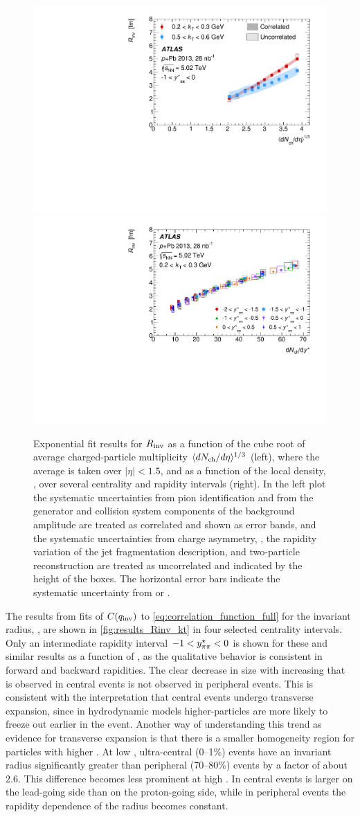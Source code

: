 \begin{figure}[t]
\centering
\includegraphics[width=0.49\linewidth]{canqinv_R_vs_avg_mult.pdf}
\includegraphics[width=0.49\linewidth]{canqinv_R_kt1_vs_mult.pdf}
\caption{Exponential fit results for $R_{\mathrm{inv}}$ as a function of the cube root of average charged-particle multiplicity $\langle d\mbox{$N_{\mathrm{ch}}$}/d\eta\rangle^{1/3}$ (left), where the average is taken over $|\eta| < 1.5$, and as a function of the local density, \dNdy, over several centrality and rapidity intervals (right). In the left plot the systematic uncertainties from pion identification and from the generator and collision system components of the background amplitude are treated as correlated and shown as error bands, and the systematic uncertainties from charge asymmetry, \Reff, the rapidity variation of the jet fragmentation description, and two-particle reconstruction are treated as uncorrelated and indicated by the height of the boxes. The horizontal error bars indicate the systematic uncertainty from \avgdNdeta or \dNdy.}
\label{fig:results_Rinv_dndeta}
\end{figure}

The results from fits of $C(q_{\mathrm{inv}})$ to \cref{eq:correlation_function_full} for the invariant radius, \Rinv, are shown in \cref{fig:results_Rinv_kt} in four selected centrality intervals.
Only an intermediate rapidity interval $-1 < y^{\star}_{\pi\pi} < 0$ is shown for these and similar results as a function of \kt, as the qualitative behavior is consistent in forward and backward rapidities.
The clear decrease in size with increasing \kt that is observed in central events is not observed in peripheral events.
This is consistent with the interpretation that central events undergo transverse expansion, since in hydrodynamic models higher-\pt particles are more likely to freeze out earlier in the event.
Another way of understanding this trend as evidence for transverse expansion is that there is a smaller homogeneity region for particles with higher \pt \cite{Kolb:2003dz}.
At low \kt, ultra-central (0--1\%) events have an invariant radius significantly greater than peripheral (70--80\%) events by a factor of about 2.6.
This difference becomes less prominent at high \kt.
In central events \Rinv is larger on the lead-going side than on the proton-going side, while in peripheral events the rapidity dependence of the radius becomes constant.

